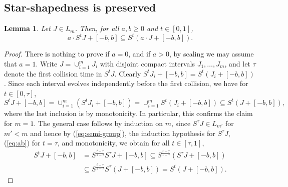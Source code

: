 \documentclass[11pt]{article}
\newtheorem{lemma}[thm]{Lemma}
\theoremstyle{definition}
\theoremstyle{proof}
\DeclareMathOperator{\+}{\mathop{\tilde{+}}}
\newcommand{\J}{L}
\numberwithin{equation}{section}
\numberwithin{equation}{section}
\begin{document}
\subsection{Star-shapedness is preserved}


\begin{lemma} \label{lem:St-sum}
Let $J \in \J_m$. Then, for all $a,b \geq 0$ and $t \in [0,1]$,
\[
a \cdot S^t J + [-b,b] \subseteq S^t(a \cdot J + [-b,b]) . 
\]
\end{lemma}
\begin{proof}
There is nothing to prove if $a = 0$, and if $a > 0$, by scaling we may assume that $a=1$. Write $J = \cup_{i=1}^m J_i$ with disjoint compact intervals $J_1,\ldots,J_m$, and let $\tau$ denote the first collision time in $S^t J$. Clearly $S^t J_i + [-b,b] = S^t (J_i + [-b,b])$. Since each interval evolves independently before the first collision, we have for $t \in [0,\tau]$,
\begin{equation} \label{eq:ab}
S^t J + [-b,b] = \cup_{i=1}^m (S^t J_i + [-b,b]) = \cup_{i=1}^m S^t(J_i + [-b,b]) \subseteq S^t(J + [-b,b]) ,
\end{equation}
where the last inclusion is by monotonicity. In particular, this confirms the claim for $m=1$. The general case follows by induction on $m$, since $S^{\tau} J \in \J_{m'}$ for $m' < m$ and hence by (\ref{eq:semi-group}), the induction hypothesis for $S^\tau J$, (\ref{eq:ab}) for $t = \tau$, and monotonicity, we obtain for all $t \in [\tau,1]$,
\begin{align*}
S^t J + [-b,b] & = S^{\frac{t-\tau}{1-\tau}} S^{\tau} J + [-b,b] \subseteq S^{\frac{t-\tau}{1-\tau}} (S^{\tau} J + [-b,b]) \\
& \subseteq S^{\frac{t-\tau}{1-\tau}} S^{\tau}(J + [-b,b]) = S^t(J + [-b,b]) . 
\end{align*}
\end{proof}
\end{document}
